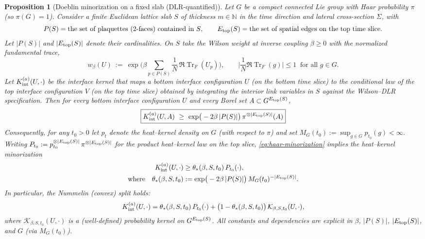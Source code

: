 \documentclass[11pt]{amsart}
\theoremstyle{plain}
\newtheorem{proposition}[theorem]{Proposition}
\theoremstyle{definition}
\theoremstyle{remark}
\DeclareMathOperator{\Tr}{Tr}
\renewcommand{\tfrac}[2]{\textstyle\frac{#1}{#2}}
\begin{document}
\begin{proposition}[Doeblin minorization on a fixed slab (DLR-quantified)]\label{prop:doeblin-interface}
Let $G$ be a compact connected Lie group with Haar probability $\pi$ (so $\pi(G)=1$).
Consider a finite Euclidean lattice slab $S$ of thickness $m\in\mathbb{N}$ in the time direction and lateral cross-section $\Sigma$, with
\[
P(S)=\text{the set of plaquettes (2-faces) contained in $S$},\qquad
E_{\rm top}(S)=\text{the set of spatial edges on the top time slice}.
\]
Let $|P(S)|$ and $|E_{\rm top}(S)|$ denote their cardinalities. On $S$ take the Wilson weight at inverse coupling $\beta\ge 0$ with the \emph{normalized} fundamental trace,
\[
w_\beta(U)\ :=\ \exp\!\Big(\beta\!\sum_{p\in P(S)} \tfrac{1}{N}\,\Re\Tr_F(U_p)\Big),\qquad \Big|\tfrac{1}{N}\Re\Tr_F(g)\Big|\le 1\ \text{ for all } g\in G.
\]
Let $K_{\rm int}^{(a)}(U,\cdot)$ be the interface kernel that maps a bottom interface configuration $U$ (on the bottom time slice) to the conditional law of the top interface configuration $V$ (on the top time slice) obtained by integrating the interior link variables in $S$ against the Wilson–DLR specification. Then for every bottom interface configuration $U$ and every Borel set $A\subset G^{E_{\rm top}(S)}$,
\begin{equation}\label{eq:haar-minorization}
  \boxed{
    K_{\rm int}^{(a)}(U,A)\ \ge\ \exp\!\big(-2\beta\,|P(S)|\big)\,\pi^{\otimes |E_{\rm top}(S)|}(A)
  }
\end{equation}
Consequently, for any $t_0>0$ let $p_t$ denote the heat--kernel density on $G$ (with respect to $\pi$) and set $M_G(t_0):=\sup_{g\in G} p_{t_0}(g)<\infty$. Writing $P_{t_0}:=p_{t_0}^{\otimes |E_{\rm top}(S)|}\,\pi^{\otimes |E_{\rm top}(S)|}$ for the product heat--kernel law on the top slice, \eqref{eq:haar-minorization} implies the heat--kernel minorization
\begin{align}\label{eq:hk-minorization}
  K_{\rm int}^{(a)}(U,\cdot) &\ge \theta_*(\beta,S,t_0)\,P_{t_0}(\cdot), \\
  \text{where}\quad \theta_*(\beta,S,t_0) &:= \exp\!\big(-2\beta\,|P(S)|\big)\,M_G(t_0)^{-|E_{\rm top}(S)|}.
\end{align}
In particular, the Nummelin (convex) split holds:
\begin{align}\label{eq:nummelin-split}
  K_{\rm int}^{(a)}(U,\cdot) = \theta_*(\beta,S,t_0)\,P_{t_0}(\cdot) + \big(1-\theta_*(\beta,S,t_0)\big)\,\mathcal{K}_{\beta,S,t_0}(U,\cdot),
\end{align}
where $\mathcal{K}_{\beta,S,t_0}(U,\cdot)$ is a (well-defined) probability kernel on $G^{E_{\rm top}(S)}$.
All constants and dependencies are explicit in $\beta$, $|P(S)|$, $|E_{\rm top}(S)|$, and $G$ (via $M_G(t_0)$).
\end{proposition}
\end{document}
